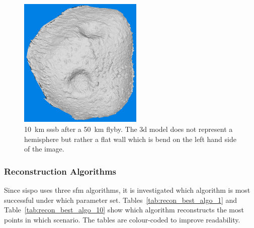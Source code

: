\begin{figure}[htb]
    \centering
    \includegraphics[width=\textwidth,height=6.2cm]{doc/thesis/0_figures/models_quality/50_10/120_50_10_refine1.png}
    \caption{\SI{10}{\kilo\meter} \gls{sssb} after a \SI{50}{\kilo\meter} flyby. The \gls{3d} model does not represent a hemisphere but rather a flat wall which is bend on the left hand side of the image.}
    \label{fig:model_flat}
\end{figure}




\subsubsection{Reconstruction Algorithms}
Since \gls{sispo} uses three \gls{sfm} algorithms, it is investigated which algorithm is most successful under which parameter set. Tables~\ref{tab:recon_best_algo_1} and Table~\ref{tab:recon_best_algo_10} show which algorithm reconstructs the most points in which scenario. The tables are colour-coded to improve readability.

